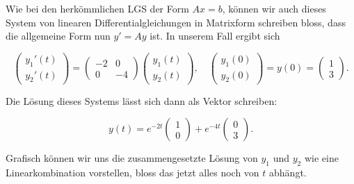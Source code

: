 Wie bei den herkömmlichen LGS der Form \( Ax = b \), können wir auch dieses System von linearen Differentialgleichungen in Matrixform schreiben bloss, dass die allgemeine Form nun \( y' = Ay \) ist. In unserem Fall ergibt sich

\begin{equation*}
    \begin{pmatrix}
        y_1'(t) \\
        y_2'(t)
    \end{pmatrix} = 
    \begin{pmatrix}
        -2 & 0 \\
        0 & -4
    \end{pmatrix}
    \begin{pmatrix}
        y_1(t) \\
        y_2(t)
    \end{pmatrix},
    \quad \begin{pmatrix}
        y_1(0) \\
        y_2(0)
    \end{pmatrix} = y(0) =
    \begin{pmatrix}
        1 \\
        3
    \end{pmatrix}.
\end{equation*}

\vspace{0.25\baselineskip}

Die Lösung dieses Systems lässt sich dann als Vektor schreiben:

\begin{equation*}
    y(t) = 
    e^{-2t}
    \begin{pmatrix}
        1 \\
        0
    \end{pmatrix} +
    e^{-4t}
    \begin{pmatrix}
        0 \\
        3
    \end{pmatrix}.
\end{equation*}

\vspace{0.25\baselineskip}

Grafisch können wir uns die zusammengesetzte Lösung von \( y_1 \) und \( y_2 \) wie eine Linearkombination vorstellen, bloss das jetzt alles noch von \( t \) abhängt. 

